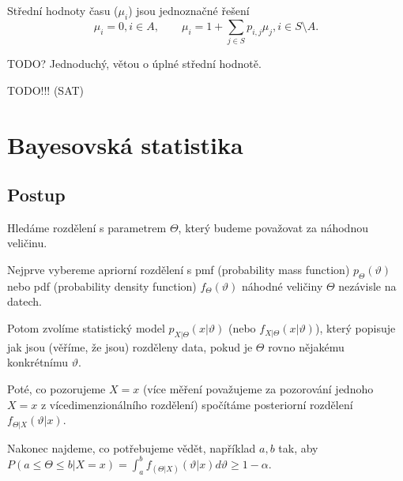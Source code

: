 \documentclass[12pt]{article}					%
\begin{document}
\begin{veta}
	Střední hodnoty času ($\mu_i$) jsou jednoznačné řešení
	$$ \mu_i = 0, i \in A, \qquad \mu_i = 1 + \sum_{j \in S} p_{i, j} \mu_j, i \in S \setminus A. $$

	\begin{dukazin}
		TODO? Jednoduchý, větou o úplné střední hodnotě. %
	\end{dukazin}
\end{veta}

TODO!!! (SAT) %

\section{Bayesovská statistika}

\subsection{Postup}

\begin{definice}
	Hledáme rozdělení s parametrem $\Theta$, který budeme považovat za náhodnou veličinu.
\end{definice}

\begin{definice}
	Nejprve vybereme apriorní rozdělení s pmf (probability mass function) $p_\Theta(\vartheta)$ nebo pdf (probability density function) $f_\Theta(\vartheta)$ náhodné veličiny $\Theta$ nezávisle na datech.
\end{definice}

\begin{definice}
	Potom zvolíme statistický model $p_{X|\Theta}(x|\vartheta)$ (nebo $f_{X|\Theta}(x|\vartheta)$), který popisuje jak jsou (věříme, že jsou) rozděleny data, pokud je $\Theta$ rovno nějakému konkrétnímu $\vartheta$.
\end{definice}

\begin{definice}
	Poté, co pozorujeme $X = x$ (více měření považujeme za pozorování jednoho $X = x$ z vícedimenzionálního rozdělení) spočítáme posteriorní rozdělení $f_{\Theta | X}(\vartheta | x)$.
\end{definice}

\begin{poznamka}
	Nakonec najdeme, co potřebujeme vědět, například $a, b$ tak, aby $P(a ≤ \Theta ≤ b | X = x) = \int_a^b f_{(\Theta | X)}(\vartheta | x) d\vartheta ≥ 1 - \alpha$.
\end{poznamka}
\end{document}
